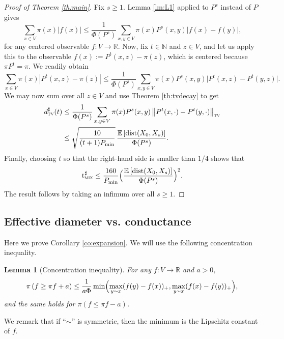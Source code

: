 \documentclass[JEP,XML,SOM,Unicode,NoEqCountersInSection,published]{cedram}
\newtheorem{lemma}{Lemma}
\theoremstyle{definition}
\newcommand{\dN}{\mathbb {N}}
\newcommand{\dR}{\mathbb {R}}
\newcommand{\EE}{{\mathbb{E}}}
\newcommand{\dtv}{d_{\textup{\textsc{tv}}}}
\newcommand{\tmix}{\mathrm{t}_{\textup{\textsc{mix}}}}
\newcommand{\pmin}{P_{\mathrm{min}}}
\DeclareMathOperator{\dist}{dist}
\begin{document}
\begin{proof}[Proof of Theorem \ref{th:main}]Fix $s\ge 1$. Lemma \ref{lm:L1} applied to $P^s$ instead of $P$ gives
\begin{equation*}
\sum_{x\in V}\pi(x)\left|f(x)\right| \le \frac{1}{\Phi(P^s)}\sum_{x,y\in V}\pi(x)P^s(x,y)|f(x)-f(y)|,
\end{equation*}
for any centered observable $f\colon V\to\dR$. Now, fix $t\in\dN$ and $z\in V$, and let us apply this to the observable $f(x):=P^t(x,z)-\pi(z)$, which is centered because $\pi P^t=\pi$. We readily obtain
\begin{equation*}
\sum_{x\in V}\pi(x)\left|P^t(x,z)-\pi(z)\right| \le \frac{1}{\Phi(P^s)}\sum_{x,y\in V}\pi(x)P^s(x,y)\bigl|P^t(x,z)-P^t(y,z)\bigr|.
\end{equation*}
We may now sum over all $z\in V$ and use Theorem \ref{th:tvdecay} to get
\begin{align*}
\dtv^\sharp(t) & \le \frac{1}{\Phi(P^s)}\sum_{x,y\in V}\pi(x)P^s(x,y)\left\|P^t(x,\cdot)-P^t(y,\cdot)\right\|_{\textsc{tv}}\\
& \le \sqrt{\frac{10}{(t+1)\pmin}}\,\frac{\EE\left[\dist(X_0,X_s)\right]}{\Phi(P^s)}.
\end{align*}
Finally, choosing $t$ so that the right-hand side is smaller than $1/4$ shows that
\begin{equation*}
\tmix^\sharp \le \frac{160}{\pmin}\Bigl(\frac{\EE\left[\dist(X_0,X_s)\right]}{\Phi(P^s)} \Bigr)^2.
\end{equation*}
The result follows by taking an infimum over all $s\ge 1$.
\end{proof}

\subsection{Effective diameter vs. conductance}\label{sec:diameter}
Here we prove Corollary \ref{co:expansion}. We will use the following concentration inequality.
\begin{lemma}[Concentration inequality]\label{lm:concentration}For any $f\colon V\to\dR$ and $a>0$,
\begin{equation*}
\pi\left(f\ge \pi f+ a\right) \le \frac{1}{a\Phi}\min \Bigl(\max_{y\sim x}(f(y)-f(x))_+,\max_{y\sim x}(f(x)-f(y))_+ \Bigr),
\end{equation*}
and the same holds for $\pi(f\le \pi f- a)$.
\end{lemma}
We remark that if ``$\sim$'' is symmetric, then the minimum is the Lipschitz constant of $f$.
\end{document}
